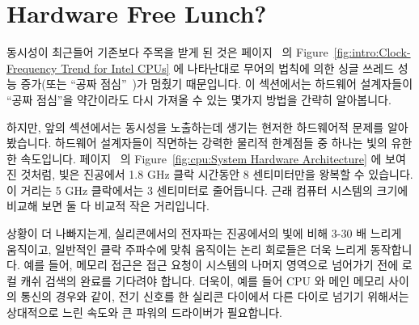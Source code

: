 
\section{Hardware Free Lunch?}
\label{sec:cpu:Hardware Free Lunch?}

동시성이 최근들어 기존보다 주목을 받게 된 것은
페이지~\pageref{fig:intro:Clock-Frequency Trend for Intel CPUs} 의
Figure~\ref{fig:intro:Clock-Frequency Trend for Intel CPUs} 에 나타난대로
무어의 법칙에 의한 싱글 쓰레드 성능 증가(또는 ``공짜
점심''~\cite{HerbSutter2008EffectiveConcurrency})가 멈췄기 때문입니다.
이 섹션에서는 하드웨어 설계자들이 ``공짜 점심''을 약간이라도 다시 가져올 수
있는 몇가지 방법을 간략히 알아봅니다.

\iffalse
The major reason that concurrency has been receiving so much focus over
the past few years is the end of Moore's-Law induced single-threaded
performance increases
(or ``free lunch''~\cite{HerbSutter2008EffectiveConcurrency}),
as shown in
Figure~\ref{fig:intro:Clock-Frequency Trend for Intel CPUs} on
page~\pageref{fig:intro:Clock-Frequency Trend for Intel CPUs}.
This section briefly surveys a few ways that hardware designers
might be able to bring back some form of the ``free lunch''.
\fi

하지만, 앞의 섹션에서는 동시성을 노출하는데 생기는 현저한 하드웨어적 문제를
알아봤습니다.
하드웨어 설계자들이 직면하는 강력한 물리적 한계점들 중 하나는 빛의 유한한
속도입니다.
페이지~\pageref{fig:cpu:System Hardware Architecture} 의
Figure~\ref{fig:cpu:System Hardware Architecture} 에 보여진 것처럼, 빛은
진공에서 1.8 GHz 클락 시간동안 8 센티미터만을 왕복할 수 있습니다.
이 거리는 5 GHz 클락에서는 3 센티미터로 줄어듭니다.
근래 컴퓨터 시스템의 크기에 비교해 보면 둘 다 비교적 작은 거리입니다.

\iffalse
However, the preceding section presented some substantial hardware
obstacles to exploiting concurrency.
One severe physical limitation that hardware designers face is the
finite speed of light.
As noted in
Figure~\ref{fig:cpu:System Hardware Architecture} on
page~\pageref{fig:cpu:System Hardware Architecture},
light can travel only about an 8-centimeters round trip
in a vacuum during the duration of a 1.8 GHz clock period.
This distance drops to about 3 centimeters for a 5 GHz clock.
Both of these distances are relatively small compared to the size
of a modern computer system.
\fi

상황이 더 나빠지는게, 실리콘에서의 전자파는 진공에서의 빛에 비해 3-30 배 느리게
움직이고, 일반적인 클락 주파수에 맞춰 움직이는 논리 회로들은 더욱 느리게
동작합니다. 예를 들어, 메모리 접근은 접근 요청이 시스템의 나머지 영역으로
넘어가기 전에 로컬 캐쉬 검색의 완료를 기다려야 합니다.
더욱이, 예를 들어 CPU 와 메인 메모리 사이의 통신의 경우와 같이, 전기 신호를 한
실리콘 다이에서 다른 다이로 넘기기 위해서는 상대적으로 느린 속도와 큰 파워의
드라이버가 필요합니다.

